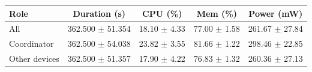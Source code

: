 \begin{tabular}{lcccc}
\hline
\textbf{Role} & \textbf{Duration (s)} & \textbf{CPU (\%)} & \textbf{Mem (\%)} & \textbf{Power (mW)} \\
\hline
All & 362.500 $\pm$ 51.354 & 18.10 $\pm$ 4.33 & 77.00 $\pm$ 1.58 & 261.67 $\pm$ 27.84 \\
Coordinator & 362.500 $\pm$ 54.038 & 23.82 $\pm$ 3.55 & 81.66 $\pm$ 1.22 & 298.46 $\pm$ 22.85 \\
Other devices & 362.500 $\pm$ 51.357 & 17.90 $\pm$ 4.22 & 76.83 $\pm$ 1.32 & 260.36 $\pm$ 27.13 \\
\hline
\end{tabular}
